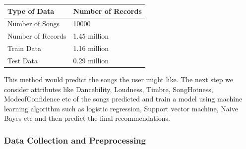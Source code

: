 \documentclass{sig-alternate-05-2015}
\begin{document}
\begin{center}
\begin{tabular} { |p{4cm}|p{4cm}| } 
\hline \textbf{Type of Data} & \textbf{Number of Records} \\
\hline Number of Songs & 10000 \\
\hline Number of Records  & 1.45 million \\
\hline Train Data & 1.16 million \\
\hline Test Data & 0.29 million \\
\hline
\end{tabular}
\end{center}

This method would predict the songs the user might like. The next step we consider attributes like Dancebility, Loudness, Timbre, SongHotness, ModeofConfidence etc of the songs predicted and train a model using machine learning algorithm such as logistic regression, Support vector machine, Naive Bayes etc and then predict the final recommendations.

\subsubsection{Data Collection and Preprocessing}
\end{document}
